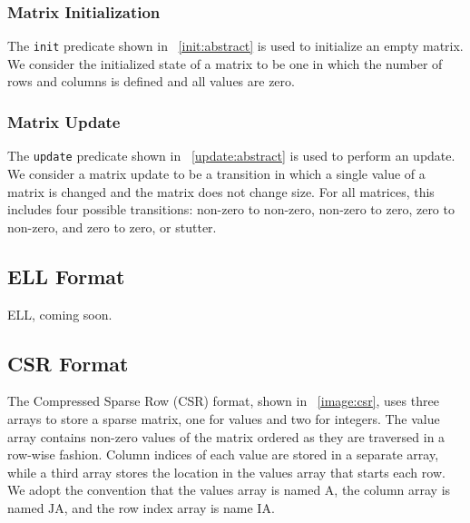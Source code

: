 \subsubsection{Matrix Initialization}

% 

The \texttt{init} predicate shown in \figurename~\ref{init:abstract} is used to initialize an empty matrix.  We consider the initialized state of a matrix to be one in which the number of rows and columns is defined and all values are zero.

\subsubsection{Matrix Update}

% 

The \texttt{update} predicate shown in \figurename~\ref{update:abstract} is used to perform an update.  We consider a matrix update to be a transition in which a single value of a matrix is changed and the matrix does not change size.  For all matrices, this includes four possible transitions: non-zero to non-zero, non-zero to zero, zero to non-zero, and zero to zero, or stutter.

\subsection{ELL Format}

ELL, coming soon.

\subsection{CSR Format}

The Compressed Sparse Row (CSR) format, shown in \figurename~\ref{image:csr}, uses three arrays to store a sparse matrix, one for values and two for integers.  The value array contains non-zero values of the matrix ordered as they are traversed in a row-wise fashion.  Column indices of each value are stored in a separate array, while a third array stores the location in the values array that starts each row.  We adopt the convention that the values array is named $\mathrm{A}$, the column array is named $\mathrm{JA}$, and the row index array is name $\mathrm{IA}$.

